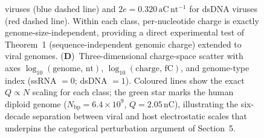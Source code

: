\begin{figure}[!htbp]
{    viruses (blue dashed line) and $2e = 0.320\,\mathrm{aC\,nt^{-1}}$ for
    dsDNA viruses (red dashed line).
    Within each class, per-nucleotide charge is exactly genome-size-independent,
    providing a direct experimental test of Theorem~1 (sequence-independent
    genomic charge) extended to viral genomes.
    (\textbf{D})~Three-dimensional charge-space scatter with axes
    $\log_{10}(\text{genome, nt})$, $\log_{10}(\text{charge, fC})$, and
    genome-type index (ssRNA $= 0$; dsDNA $= 1$).
    Coloured lines show the exact $Q \propto N$ scaling for each class;
    the green star marks the human diploid genome ($N_{\mathrm{bp}} =
    6.4 \times 10^9$, $Q = 2.05\,\mathrm{nC}$), illustrating the six-decade
    separation between viral and host electrostatic scales that
    underpins the categorical perturbation argument of Section~5.}
    \label{fig:viral_panel2}
\end{figure}

